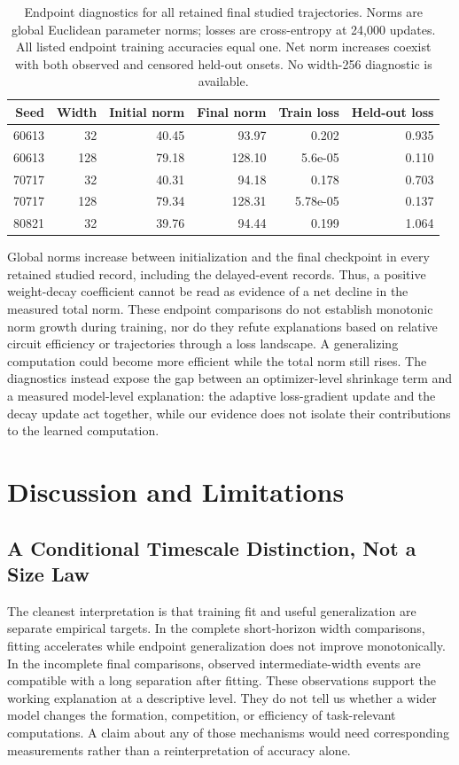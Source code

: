 \documentclass{article}
\begin{document}
\begin{table}[t]
\centering
\caption{Endpoint diagnostics for all retained final studied trajectories. Norms are global Euclidean parameter norms; losses are cross-entropy at 24,000 updates. All listed endpoint training accuracies equal one. Net norm increases coexist with both observed and censored held-out onsets. No width-256 diagnostic is available.}
\label{tab:normloss}
\small
\begin{tabular}{rrrrrr}
\toprule
Seed & Width & Initial norm & Final norm & Train loss & Held-out loss \\
\midrule
60613 & 32 & 40.45 & 93.97 & 0.202 & 0.935 \\
60613 & 128 & 79.18 & 128.10 & 5.6e-05 & 0.110 \\
70717 & 32 & 40.31 & 94.18 & 0.178 & 0.703 \\
70717 & 128 & 79.34 & 128.31 & 5.78e-05 & 0.137 \\
80821 & 32 & 39.76 & 94.44 & 0.199 & 1.064 \\
\bottomrule
\end{tabular}
\end{table}

Global norms increase between initialization and the final checkpoint in every retained studied record, including the delayed-event records. Thus, a positive weight-decay coefficient cannot be read as evidence of a net decline in the measured total norm. These endpoint comparisons do not establish monotonic norm growth during training, nor do they refute explanations based on relative circuit efficiency or trajectories through a loss landscape. A generalizing computation could become more efficient while the total norm still rises. The diagnostics instead expose the gap between an optimizer-level shrinkage term and a measured model-level explanation: the adaptive loss-gradient update and the decay update act together, while our evidence does not isolate their contributions to the learned computation.

\section{Discussion and Limitations}
\subsection{A Conditional Timescale Distinction, Not a Size Law}
The cleanest interpretation is that training fit and useful generalization are separate empirical targets. In the complete short-horizon width comparisons, fitting accelerates while endpoint generalization does not improve monotonically. In the incomplete final comparisons, observed intermediate-width events are compatible with a long separation after fitting. These observations support the working explanation at a descriptive level. They do not tell us whether a wider model changes the formation, competition, or efficiency of task-relevant computations. A claim about any of those mechanisms would need corresponding measurements rather than a reinterpretation of accuracy alone.
\end{document}
